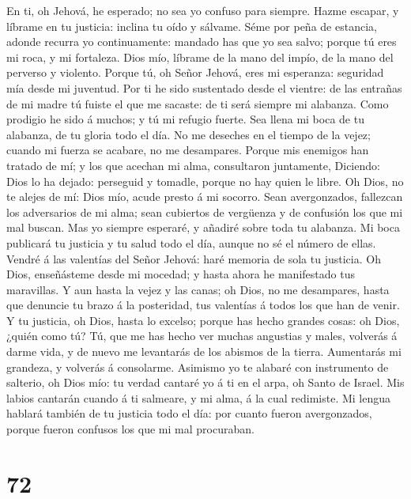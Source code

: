  En ti, oh Jehová, he esperado; no sea yo confuso para
siempre.  Hazme escapar, y líbrame en tu justicia: inclina
tu oído y sálvame.  Séme por peña de estancia, adonde
recurra yo continuamente: mandado has que yo sea salvo; porque tú eres
mi roca, y mi fortaleza.  Dios mío, líbrame de la mano del
impío, de la mano del perverso y violento.  Porque tú, oh
Señor Jehová, eres mi esperanza: seguridad mía desde mi juventud.
 Por ti he sido sustentado desde el vientre: de las
entrañas de mi madre tú fuiste el que me sacaste: de ti será siempre mi
alabanza.  Como prodigio he sido á muchos; y tú mi refugio
fuerte.  Sea llena mi boca de tu alabanza, de tu gloria
todo el día.  No me deseches en el tiempo de la vejez;
cuando mi fuerza se acabare, no me desampares.  Porque
mis enemigos han tratado de mí; y los que acechan mi alma, consultaron
juntamente,  Diciendo: Dios lo ha dejado: perseguid y
tomadle, porque no hay quien le libre.  Oh Dios, no te
alejes de mí: Dios mío, acude presto á mi socorro.  Sean
avergonzados, fallezcan los adversarios de mi alma; sean cubiertos de
vergüenza y de confusión los que mi mal buscan.  Mas yo
siempre esperaré, y añadiré sobre toda tu alabanza.  Mi
boca publicará tu justicia y tu salud todo el día, aunque no sé el
número de ellas.  Vendré á las valentías del Señor
Jehová: haré memoria de sola tu justicia.  Oh Dios,
enseñásteme desde mi mocedad; y hasta ahora he manifestado tus
maravillas.  Y aun hasta la vejez y las canas; oh Dios,
no me desampares, hasta que denuncie tu brazo á la posteridad, tus
valentías á todos los que han de venir.  Y tu justicia,
oh Dios, hasta lo excelso; porque has hecho grandes cosas: oh Dios,
¿quién como tú?  Tú, que me has hecho ver muchas
angustias y males, volverás á darme vida, y de nuevo me levantarás de
los abismos de la tierra.  Aumentarás mi grandeza, y
volverás á consolarme.  Asimismo yo te alabaré con
instrumento de salterio, oh Dios mío: tu verdad cantaré yo á ti en el
arpa, oh Santo de Israel.  Mis labios cantarán cuando á
ti salmeare, y mi alma, á la cual redimiste.  Mi lengua
hablará también de tu justicia todo el día: por cuanto fueron
avergonzados, porque fueron confusos los que mi mal procuraban.

\hypertarget{section-71}{%
\section{72}\label{section-71}}

